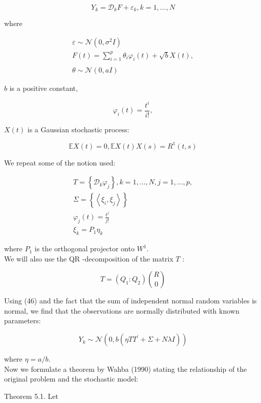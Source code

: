\documentclass[10pt]{article}
\begin{document}
\begin{equation*}
Y_{k}=\mathcal{D}_{k} F+\varepsilon_{k}, k=1, \ldots, N \tag{46}
\end{equation*}


where

$$
\begin{gathered}
\varepsilon \sim \mathcal{N}\left(0, \sigma^{2} I\right) \\
F(t)=\sum_{i=1}^{p} \theta_{i} \varphi_{i}(t)+\sqrt{b} X(t), \\
\\
\theta \sim \mathcal{N}(0, a I)
\end{gathered}
$$

$b$ is a positive constant,

$$
\varphi_{i}(t)=\frac{t^{i}}{i!},
$$

$X(t)$ is a Gaussian stochastic process:

$$
\mathbb{E} X(t)=0, \mathbb{E} X(t) X(s)=R^{1}(t, s)
$$

We repeat some of the notion used:

$$
\begin{gathered}
T=\left\{\mathcal{D}_{k} \varphi_{j}\right\}, k=1, \ldots, N, j=1, \ldots, p, \\
\Sigma=\left\{\left\langle\xi_{i}, \xi_{j}\right\rangle\right\} \\
\varphi_{j}(t)=\frac{t^{j}}{j!} \\
\xi_{k}=P_{1} \eta_{k}
\end{gathered}
$$

where $P_{1}$ is the orthogonal projector onto $W^{1}$.\\
We will also use the QR -decomposition of the matrix $T$ :

$$
T=\left(Q_{1}: Q_{2}\right)\binom{R}{0}
$$

Using (46) and the fact that the sum of independent normal random variables is normal, we find that the observations are normally distributed with known parameters:


\begin{equation*}
Y_{k} \sim \mathcal{N}\left(0, b\left(\eta T T^{\prime}+\Sigma+N \lambda I\right)\right) \tag{47}
\end{equation*}


where $\eta=a / b$.\\
Now we formulate a theorem by Wahba (1990) stating the relationship of the original problem and the stochastic model:

Theorem 5.1. Let
\end{document}
